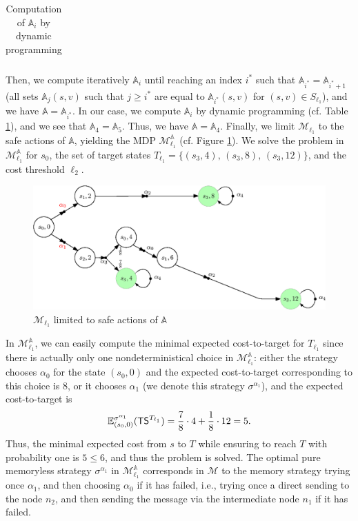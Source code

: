 \begin{example}
\begin{table}[h]
\begin{tabular}{l|cccccc}
\end{tabular}
  \caption{Computation of $\mathbb{A}_i$ by dynamic programming}
  \label{my-table2}
\end{table}
Then, we compute iteratively $\mathbb{A}_i$ until reaching an index $i^*$ such that $\mathbb{A}_{i^*} = \mathbb{A}_{i^*+1}$ (all sets $\mathbb{A}_{j}(s, v)$ such that $j \geq i^*$ are equal to $\mathbb{A}_{i^*}(s, v)$ for $(s, v)\in S_{\ell_1}$), and we have $\mathbb{A} = \mathbb{A}_{i^*}$.
In our case, we compute $\mathbb{A}_i$ by dynamic programming (cf. Table \ref{my-table2}), and we see that $\mathbb{A}_4=\mathbb{A}_5$. Thus, we have $\mathbb{A} = \mathbb{A}_4$.
Finally, we limit $\mathcal{M}_{\ell_1}$ to the safe actions of $\mathbb{A}$, yielding the MDP $\mathcal{M}_{\ell_1}^\mathbb{A}$ (cf. Figure \ref{safe_actions}).
We solve the \SSPE{} problem in $\mathcal{M}_{\ell_1}^\mathbb{A}$ for $s_0$, the set of target states $T_{\ell_1} = \{(s_3, 4), \, (s_3, 8), \, (s_3, 12)\}$, and the cost threshold $\ell_2$.
\begin{figure}[h]
  \centering
  \includegraphics[width=0.8\linewidth]{resources/main-example-unfoldingA}
  \caption{$\mathcal{M}_{\ell_1}$ limited to safe actions of $\mathbb{A}$}
  \label{safe_actions}
\end{figure}
In $\mathcal{M}_{\ell_1}^\mathbb{A}$, we can easily compute the minimal expected cost-to-target for $T_{\ell_1}$ since there is actually only one nondeterministical choice in $\mathcal{M}_{\ell_1}^\mathbb{A}$: either the strategy chooses $\alpha_0$ for the state $(s_0, 0)$ and the expected cost-to-target corresponding to this choice is $8$, or it chooses $\alpha_1$ (we denote this strategy $\sigma^{\alpha_1}$), and the expected cost-to-target is
\[
  \mathbb{E}^{\sigma^{\alpha_1}}_{(s_0, 0)}(\text{\sffamily TS}^{T_{\ell_1}}) = \frac{7}{8} \cdot 4 + \frac{1}{8} \cdot 12 = 5.
\]
Thus, the minimal expected cost from $s$ to $T$ while ensuring to reach $T$ with probability one is $5 \leq 6$, and thus the \SSPWE{} problem is solved. The optimal pure memoryless strategy $\sigma^{\alpha_1}$ in $\mathcal{M}_{\ell_1}^\mathbb{A}$ corresponds
in $\mathcal{M}$ to the memory strategy trying once $\alpha_1$, and then choosing $\alpha_0$ if it has failed, i.e., trying once a direct sending to the node $n_2$, and then sending the message via the intermediate node $n_1$ if it has failed.
\end{example}


